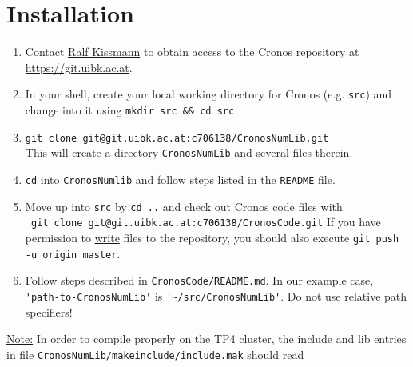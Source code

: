 \section{Installation}


\begin{enumerate}
\item Contact \href{mailto:ralf.kissmann@uibk.ac.at}{Ralf Kissmann} to obtain
  access to the Cronos repository at \url{https://git.uibk.ac.at}.%
\item In your shell, create your local working directory for Cronos
  (e.g. {\tt src}) and change into it using \verb+mkdir src && cd src+
\item \verb+git clone git@git.uibk.ac.at:c706138/CronosNumLib.git+ \\
  This will create a directory \mbox{\tt CronosNumLib} and several files
  therein. 
\item {\tt cd} into {\tt CronosNumlib} and follow steps listed in the
  {\tt README} file.
\item Move up into {\tt src} by {\tt cd ..} and check out Cronos code files
  with \\
  \verb+ git clone git@git.uibk.ac.at:c706138/CronosCode.git+ 
  If you have permission to \underline{write} files to the repository,
  you should also execute \verb+git push -u origin master+.
\item Follow steps described in {\tt CronosCode/README.md}.
  In our example case, \verb+'path-to-CronosNumLib'+ is
  \verb+'~/src/CronosNumLib'+. Do not use relative path specifiers!
\end{enumerate}

\ul{Note:} In order to compile properly on the TP4 cluster, the include and lib entries in file
\verb+CronosNumLib/makeinclude/include.mak+ should read

